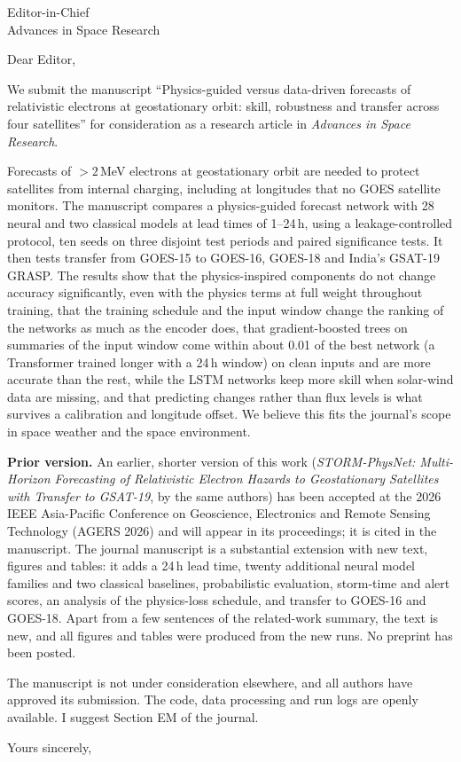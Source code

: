 \documentclass[11pt,a4paper]{letter}
\begin{document}
\begin{letter}{Editor-in-Chief\\Advances in Space Research}
\opening{Dear Editor,}

We submit the manuscript ``Physics-guided versus data-driven forecasts of relativistic electrons at
geostationary orbit: skill, robustness and transfer across four satellites'' for consideration as a research
article in \emph{Advances in Space Research}.

Forecasts of \(>2\)\,MeV electrons at geostationary orbit are needed to protect satellites from internal
charging, including at longitudes that no GOES satellite monitors. The manuscript compares a physics-guided
forecast network with 28 neural and two classical models at lead times of 1--24\,h, using a leakage-controlled protocol, ten
seeds on three disjoint test periods and paired significance tests. It then tests transfer from GOES-15 to
GOES-16, GOES-18 and India's GSAT-19 GRASP. The results show that the physics-inspired components do not change
accuracy significantly, even with the physics terms at full weight throughout training, that the training schedule and the input window change the ranking of the networks as much as the encoder does, that
gradient-boosted trees on summaries of the input window come within about 0.01 of the best network (a Transformer
trained longer with a 24\,h window) on clean inputs and are more accurate than the rest, while the LSTM networks keep more skill when solar-wind data are missing, and that
predicting changes rather than flux levels is what survives a calibration and longitude offset. We believe this fits the journal's scope in space weather and the space environment.

\textbf{Prior version.} An earlier, shorter version of this work (\emph{STORM-PhysNet: Multi-Horizon Forecasting
of Relativistic Electron Hazards to Geostationary Satellites with Transfer to GSAT-19}, by the same authors) has been
accepted at the 2026 IEEE Asia-Pacific Conference on Geoscience, Electronics and Remote Sensing Technology (AGERS 2026)
and will appear in its proceedings; it is cited in the manuscript. The journal manuscript is a substantial extension
with new text, figures and tables: it adds a 24\,h lead time, twenty additional neural model families and two
classical baselines, probabilistic evaluation, storm-time and alert scores, an analysis of the physics-loss schedule,
and transfer to GOES-16 and GOES-18. Apart from a few sentences of the related-work summary, the text is new, and all figures and tables were produced from the new runs. No preprint has been
posted.

The manuscript is not under consideration elsewhere, and all authors have approved its submission. The code, data processing and run logs are openly
available. I suggest Section EM of the journal.

\closing{Yours sincerely,}
\end{letter}
\end{document}
